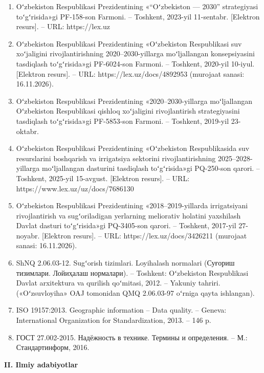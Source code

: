\documentclass[14pt,a4paper,oneside]{extreport}
\begin{document}
\begin{enumerate}
\def\labelenumi{\arabic{enumi}.}
\item
  Oʻzbekiston Respublikasi Prezidentining «``Oʻzbekiston --- 2030''
  strategiyasi toʻgʻrisida»gi PF-158-son Farmoni. -- Toshkent, 2023-yil
  11-sentabr. {[}Elektron resurs{]}. -- URL: https://lex.uz
\item
  Oʻzbekiston Respublikasi Prezidentining «Oʻzbekiston Respublikasi suv
  xoʻjaligini rivojlantirishning 2020--2030-yillarga moʻljallangan
  konsepsiyasini tasdiqlash toʻgʻrisida»gi PF-6024-son Farmoni. --
  Toshkent, 2020-yil 10-iyul. {[}Elektron resurs{]}. -- URL:
  https://lex.uz/docs/4892953 (murojaat sanasi: 16.11.2026).
\item
  Oʻzbekiston Respublikasi Prezidentining «2020--2030-yillarga
  moʻljallangan Oʻzbekiston Respublikasi qishloq xoʻjaligini
  rivojlantirish strategiyasini tasdiqlash toʻgʻrisida»gi PF-5853-son
  Farmoni. -- Toshkent, 2019-yil 23-oktabr.
\item
  Oʻzbekiston Respublikasi Prezidentining «Oʻzbekiston Respublikasida
  suv resurslarini boshqarish va irrigatsiya sektorini
  rivojlantirishning 2025--2028-yillarga moʻljallangan dasturini
  tasdiqlash toʻgʻrisida»gi PQ-250-son qarori. -- Toshkent, 2025-yil
  15-avgust. {[}Elektron resurs{]}. -- URL:
  https://www.lex.uz/uz/docs/7686130
\item
  Oʻzbekiston Respublikasi Prezidentining «2018--2019-yillarda
  irrigatsiyani rivojlantirish va sugʻoriladigan yerlarning meliorativ
  holatini yaxshilash Davlat dasturi toʻgʻrisida»gi PQ-3405-son qarori.
  -- Toshkent, 2017-yil 27-noyabr. {[}Elektron resurs{]}. -- URL:
  https://lex.uz/docs/3426211 (murojaat sanasi: 16.11.2026).
\item
  ShNQ 2.06.03-12. Sugʻorish tizimlari. Loyihalash normalari (Суғориш
  тизимлари. Лойиҳалаш нормалари). -- Toshkent: Oʻzbekiston Respublikasi
  Davlat arxitektura va qurilish qoʻmitasi, 2012. -- Yakuniy tahriri.
  («Oʻzsuvloyiha» OAJ tomonidan QMQ 2.06.03-97 oʻrniga qayta ishlangan).
\item
  ISO 19157:2013. Geographic information -- Data quality. -- Geneva:
  International Organization for Standardization, 2013. -- 146 p.
\item
  ГОСТ 27.002-2015. Надёжность в технике. Термины и определения. -- М.:
  Стандартинформ, 2016.
\end{enumerate}

\textbf{II. Ilmiy adabiyotlar}
\end{document}
